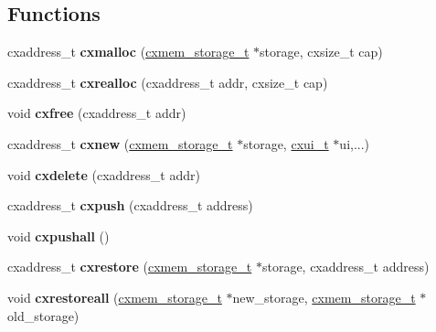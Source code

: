 \subsection*{Functions}
\begin{DoxyCompactItemize}
\item 
\mbox{\label{a00017_a79f881f6b5d0e7240669c94efdd9a1fe}} 
cxaddress\+\_\+t {\bfseries cxmalloc} (\hyperlink{a00056}{cxmem\+\_\+storage\+\_\+t} $\ast$storage, cxsize\+\_\+t cap)
\item 
\mbox{\label{a00017_ad0e71c095779be36c9f1b59bdb046ce3}} 
cxaddress\+\_\+t {\bfseries cxrealloc} (cxaddress\+\_\+t addr, cxsize\+\_\+t cap)
\item 
\mbox{\label{a00017_aa385ca512cff4b8c301e8a53433717ef}} 
void {\bfseries cxfree} (cxaddress\+\_\+t addr)
\item 
\mbox{\label{a00017_ad54d278ec209a424cadf8f9fadb12a16}} 
cxaddress\+\_\+t {\bfseries cxnew} (\hyperlink{a00056}{cxmem\+\_\+storage\+\_\+t} $\ast$storage, \hyperlink{a00076}{cxui\+\_\+t} $\ast$ui,...)
\item 
\mbox{\label{a00017_a3db54ac7c72f2bc05eebe2d4a1af5ba1}} 
void {\bfseries cxdelete} (cxaddress\+\_\+t addr)
\item 
\mbox{\label{a00017_a82077f7f1f9c7357eab44f2723a5d4b0}} 
cxaddress\+\_\+t {\bfseries cxpush} (cxaddress\+\_\+t address)
\item 
\mbox{\label{a00017_a88798e8e4491762a9ca0f5b7024a8d4d}} 
void {\bfseries cxpushall} ()
\item 
\mbox{\label{a00017_abf00dae1b2b6acb3018f47db17101a3c}} 
cxaddress\+\_\+t {\bfseries cxrestore} (\hyperlink{a00056}{cxmem\+\_\+storage\+\_\+t} $\ast$storage, cxaddress\+\_\+t address)
\item 
\mbox{\label{a00017_a00ca5fd486c44a30fd7632301e9a20b0}} 
void {\bfseries cxrestoreall} (\hyperlink{a00056}{cxmem\+\_\+storage\+\_\+t} $\ast$new\+\_\+storage, \hyperlink{a00056}{cxmem\+\_\+storage\+\_\+t} $\ast$old\+\_\+storage)
\end{DoxyCompactItemize}
